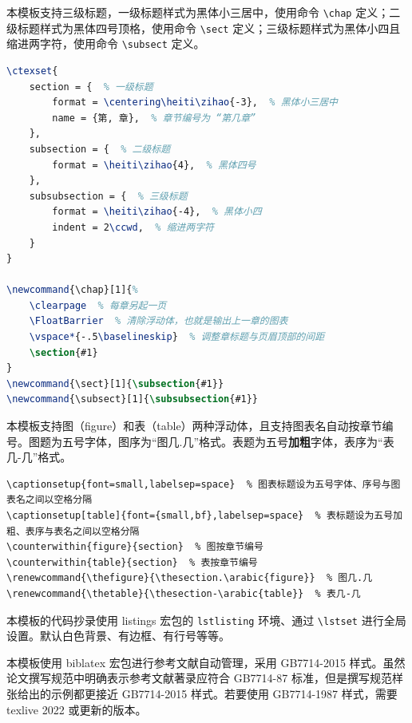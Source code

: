 本模板支持三级标题，一级标题样式为黑体小三居中，使用命令 \verb!\chap! 定义；二级标题样式为黑体四号顶格，使用命令 \verb!\sect! 定义；三级标题样式为黑体小四且缩进两字符，使用命令 \verb!\subsect! 定义。
\begin{lstlisting}[numbers=none,language=TeX]
% 标题设置
\ctexset{
	section = {  % 一级标题
		format = \centering\heiti\zihao{-3},  % 黑体小三居中
		name = {第, 章},  % 章节编号为 “第几章”
	},
	subsection = {  % 二级标题
		format = \heiti\zihao{4},  % 黑体四号
	},
	subsubsection = {  % 三级标题
		format = \heiti\zihao{-4},  % 黑体小四
        indent = 2\ccwd,  % 缩进两字符
	}
}

\newcommand{\chap}[1]{%
	\clearpage  % 每章另起一页
    \FloatBarrier  % 清除浮动体，也就是输出上一章的图表
    \vspace*{-.5\baselineskip}  % 调整章标题与页眉顶部的间距
	\section{#1}
}
\newcommand{\sect}[1]{\subsection{#1}}
\newcommand{\subsect}[1]{\subsubsection{#1}}
\end{lstlisting}

本模板支持图（figure）和表（table）两种浮动体，且支持图表名自动按章节编号。图题为五号字体，图序为“图几.几”格式。表题为五号\textbf{加粗}字体，表序为“表几-几”格式。

\begin{lstlisting}[numbers=none]
\captionsetup{font=small,labelsep=space}  % 图表标题设为五号字体、序号与图表名之间以空格分隔
\captionsetup[table]{font={small,bf},labelsep=space}  % 表标题设为五号加粗、表序与表名之间以空格分隔
\counterwithin{figure}{section}  % 图按章节编号
\counterwithin{table}{section}  % 表按章节编号
\renewcommand{\thefigure}{\thesection.\arabic{figure}}  % 图几.几
\renewcommand{\thetable}{\thesection-\arabic{table}}  % 表几-几
\end{lstlisting}

本模板的代码抄录使用 listings 宏包的 \verb!lstlisting! 环境、通过 \verb!\lstset! 进行全局设置。默认白色背景、有边框、有行号等等。

本模板使用 biblatex 宏包进行参考文献自动管理，采用 GB7714-2015 样式。虽然论文撰写规范中明确表示参考文献著录应符合 GB7714-87 标准，但是撰写规范样张给出的示例都更接近 GB7714-2015 样式。若要使用 GB7714-1987 样式，需要 texlive 2022 或更新的版本。

